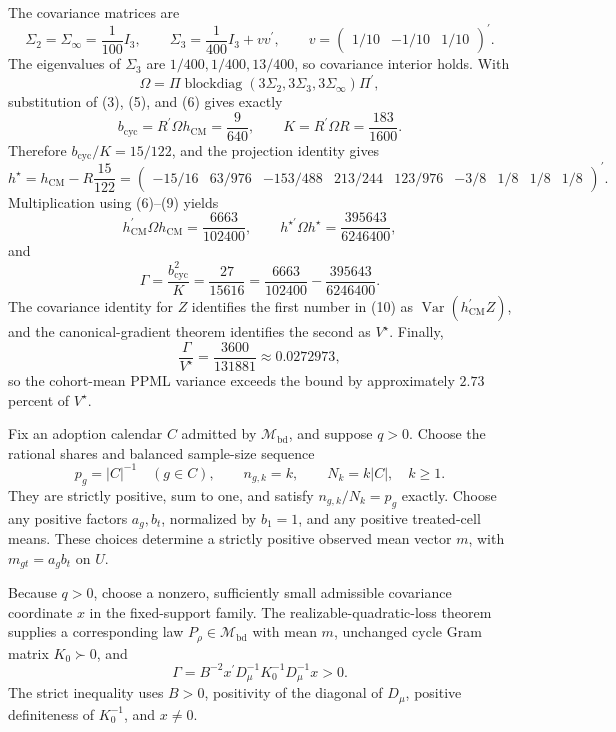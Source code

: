The covariance matrices are
\[
\Sigma_2=\Sigma_\infty=\frac1{100}I_3,
\qquad
\Sigma_3=\frac1{400}I_3+vv^{\prime},
\qquad
v=\begin{pmatrix}1/10&-1/10&1/10\end{pmatrix}^{\prime}.                \tag{6}
\]
The eigenvalues of \(\Sigma_3\) are
\(1/400,1/400,13/400\), so covariance interior holds.  With
\[
\Omega=\Pi\operatorname{blockdiag}(3\Sigma_2,3\Sigma_3,3\Sigma_\infty)
\Pi^{\prime},                                                           \tag{7}
\]
substitution of (3), (5), and (6) gives exactly
\[
b_{\mathrm{cyc}}=R^{\prime}\Omega h_{\mathrm{CM}}=\frac9{640},
\qquad
K=R^{\prime}\Omega R=\frac{183}{1600}.                                 \tag{8}
\]
Therefore \(b_{\mathrm{cyc}}/K=15/122\), and the projection identity gives
\[
h^{\star}=h_{\mathrm{CM}}-R\frac{15}{122}
=\begin{pmatrix}
-15/16&63/976&-153/488&213/244&123/976&-3/8&1/8&1/8&1/8
\end{pmatrix}^{\prime}.                                                  \tag{9}
\]
Multiplication using (6)--(9) yields
\[
h_{\mathrm{CM}}^{\prime}\Omega h_{\mathrm{CM}}
=\frac{6663}{102400},
\qquad
h^{\star\prime}\Omega h^{\star}
=\frac{395643}{6246400},                                                 \tag{10}
\]
and
\[
\Gamma
=\frac{b_{\mathrm{cyc}}^2}{K}
=\frac{27}{15616}
=\frac{6663}{102400}-\frac{395643}{6246400}.                            \tag{11}
\]
The covariance identity for \(Z\) identifies the first number in (10) as
\(\operatorname{Var}(h_{\mathrm{CM}}^{\prime}Z)\), and the canonical-gradient theorem identifies the second as \(V^{\star}\).  Finally,
\[
\frac{\Gamma}{V^{\star}}=\frac{3600}{131881}\approx0.0272973,
\]
so the cohort-mean PPML variance exceeds the bound by approximately \(2.73\) percent of \(V^{\star}\).

Fix an adoption calendar \(C\) admitted by \(\mathcal M_{\mathrm{bd}}\), and suppose \(q>0\).  Choose the rational shares and balanced sample-size sequence
\[
p_g=|C|^{-1}\quad(g\in C),
\qquad
n_{g,k}=k,
\qquad
N_k=k|C|,
\quad k\ge1.                                                            \tag{1}
\]
They are strictly positive, sum to one, and satisfy
\(n_{g,k}/N_k=p_g\) exactly.  Choose any positive factors \(a_g,b_t\), normalized by \(b_1=1\), and any positive treated-cell means.  These choices determine a strictly positive observed mean vector \(m\), with
\(m_{gt}=a_gb_t\) on \(U\).

Because \(q>0\), choose a nonzero, sufficiently small admissible covariance coordinate \(x\) in the fixed-support family.  The realizable-quadratic-loss theorem supplies a corresponding law
\(P_\rho\in\mathcal M_{\mathrm{bd}}\) with mean \(m\), unchanged cycle Gram matrix \(K_0\succ0\), and
\[
\Gamma
=B^{-2}x^{\prime}D_\mu^{-1}K_0^{-1}D_\mu^{-1}x>0.                    \tag{2}
\]
The strict inequality uses \(B>0\), positivity of the diagonal of \(D_\mu\), positive definiteness of \(K_0^{-1}\), and \(x\ne0\).

